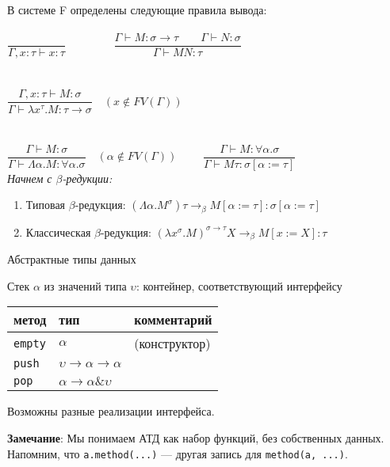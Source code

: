 \documentclass[aspectratio=169]{beamer}
\begin{document}
\begin{frame}
 	В системе F определены следующие правила вывода: \\ \\
  	\noindent
 	{$\dfrac{}{\Gamma,x:\tau\vdash x:\tau}\qquad\qquad$} 
 	{$\dfrac{\Gamma\vdash M:\sigma\rightarrow\tau\qquad\Gamma\vdash N:\sigma}{\Gamma\vdash M N:\tau}$}\\  \\ \\
 	{$\dfrac{\Gamma,x:\tau\vdash M:\sigma}{\Gamma\vdash\lambda x^{\tau}.M:\tau\rightarrow\sigma}\quad(x\notin FV(\Gamma))$}\\ \\ \\
 	{$\dfrac{\Gamma\vdash M:\sigma}{\Gamma\vdash\Lambda\alpha.M:\forall\alpha.\sigma}\quad(\alpha\notin FV(\Gamma))\qquad$}
 	 $\dfrac{\Gamma\vdash M:\forall\alpha.\sigma}{\Gamma\vdash M\tau:\sigma[\alpha:=\tau]}$
 	\\
 	
    \emph{Начнем с $\beta$-редукции:}
    \begin{enumerate}
        \item Типовая $\beta$-редукция: $(\Lambda\alpha.M^{\sigma})\tau\rightarrow_\beta M[\alpha:= \tau]:\sigma[\alpha:= \tau]$
        \item Классическая $\beta$-редукция: $(\lambda x^{\sigma}.M)^{\sigma\rightarrow\tau}X\rightarrow_\beta M[x:=X]:\tau$ 
    \end{enumerate}
 	
\end{frame}

\begin{frame}[fragile]{Абстрактные типы данных}

	Стек $\alpha$ из значений типа $\upsilon$: контейнер, соответствующий интерфейсу

	\begin{center}\begin{tabular}{lll}
	метод & тип & комментарий\\\hline
	\verb!empty! & $\alpha$ & (конструктор)\\
	\verb!push! & $\upsilon \rightarrow \alpha \rightarrow \alpha$\\
	\verb!pop! & $\alpha \rightarrow \alpha \& \upsilon$
	\end{tabular}\end{center}

	Возможны разные реализации интерфейса.\vspace{0.5cm}

	\textbf{Замечание}:  Мы понимаем АТД как набор функций, без собственных данных.
	Напомним, что \verb!a.method(...)! --- другая запись для \verb!method(a, ...)!.
\end{frame}
\end{document}
